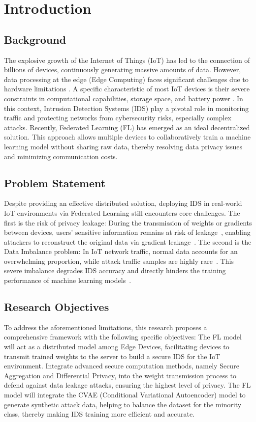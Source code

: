\chapter{Introduction}
\section{Background}
The explosive growth of the Internet of Things (IoT) has led to the connection of billions of devices, continuously generating massive amounts of data. However, data processing at the edge (Edge Computing) faces significant challenges due to hardware limitations \cite{shi2016}. A specific characteristic of most IoT devices is their severe constraints in computational capabilities, storage space, and battery power \cite{imteaj2022}.
In this context, Intrusion Detection Systems (IDS) play a pivotal role in monitoring traffic and protecting networks from cybersecurity risks, especially complex attacks. Recently, Federated Learning (FL) has emerged as an ideal decentralized solution. This approach allows multiple devices to collaboratively train a machine learning model without sharing raw data, thereby resolving data privacy issues and minimizing communication costs.

\section{Problem Statement}
Despite providing an effective distributed solution, deploying IDS in real-world IoT environments via Federated Learning still encounters core challenges. The first is the risk of privacy leakage: During the transmission of weights or gradients between devices, users' sensitive information remains at risk of leakage~\cite{cunhaneto2023}, enabling attackers to reconstruct the original data via gradient leakage~\cite{zhu2019}. The second is the Data Imbalance problem: In IoT network traffic, normal data accounts for an overwhelming proportion, while attack traffic samples are highly rare~\cite{alatram2023}. This severe imbalance degrades IDS accuracy and directly hinders the training performance of machine learning models~\cite{he2009}.


\section{Research Objectives}
To address the aforementioned limitations, this research proposes a comprehensive framework with the following specific objectives:
The FL model will act as a distributed model among Edge Devices, facilitating devices to transmit trained weights to the server to build a secure IDS for the IoT environment.
Integrate advanced secure computation methods, namely Secure Aggregation and Differential Privacy, into the weight transmission process to defend against data leakage attacks, ensuring the highest level of privacy.
The FL model will integrate the CVAE (Conditional Variational Autoencoder) model to generate synthetic attack data, helping to balance the dataset for the minority class, thereby making IDS training more efficient and accurate.

